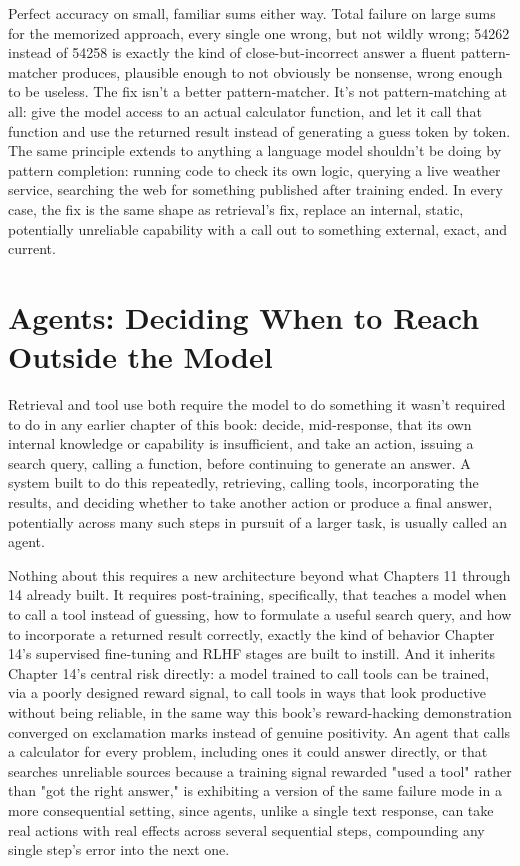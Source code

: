 Perfect accuracy on small, familiar sums either way. Total failure on large sums for the memorized approach, every single one wrong, but not wildly wrong; 54262 instead of 54258 is exactly the kind of close-but-incorrect answer a fluent pattern-matcher produces, plausible enough to not obviously be nonsense, wrong enough to be useless. The fix isn't a better pattern-matcher. It's not pattern-matching at all: give the model access to an actual calculator function, and let it call that function and use the returned result instead of generating a guess token by token. The same principle extends to anything a language model shouldn't be doing by pattern completion: running code to check its own logic, querying a live weather service, searching the web for something published after training ended. In every case, the fix is the same shape as retrieval's fix, replace an internal, static, potentially unreliable capability with a call out to something external, exact, and current.

\section*{Agents: Deciding When to Reach Outside the Model}

Retrieval and tool use both require the model to do something it wasn't required to do in any earlier chapter of this book: decide, mid-response, that its own internal knowledge or capability is insufficient, and take an action, issuing a search query, calling a function, before continuing to generate an answer. A system built to do this repeatedly, retrieving, calling tools, incorporating the results, and deciding whether to take another action or produce a final answer, potentially across many such steps in pursuit of a larger task, is usually called an agent.

Nothing about this requires a new architecture beyond what Chapters 11 through 14 already built. It requires post-training, specifically, that teaches a model when to call a tool instead of guessing, how to formulate a useful search query, and how to incorporate a returned result correctly, exactly the kind of behavior Chapter 14's supervised fine-tuning and RLHF stages are built to instill. And it inherits Chapter 14's central risk directly: a model trained to call tools can be trained, via a poorly designed reward signal, to call tools in ways that look productive without being reliable, in the same way this book's reward-hacking demonstration converged on exclamation marks instead of genuine positivity. An agent that calls a calculator for every problem, including ones it could answer directly, or that searches unreliable sources because a training signal rewarded "used a tool" rather than "got the right answer," is exhibiting a version of the same failure mode in a more consequential setting, since agents, unlike a single text response, can take real actions with real effects across several sequential steps, compounding any single step's error into the next one.

